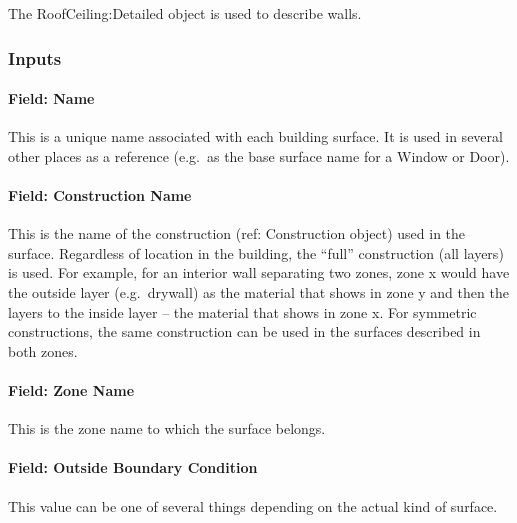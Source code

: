 The RoofCeiling:Detailed object is used to describe walls.

\subsubsection{Inputs}\label{inputs-21-007}

\paragraph{Field: Name}\label{field-name-17-008}

This is a unique name associated with each building surface. It is used in several other places as a reference (e.g.~as the base surface name for a Window or Door).

\paragraph{Field: Construction Name}\label{field-construction-name-17}

This is the name of the construction (ref: Construction object) used in the surface. Regardless of location in the building, the ``full'' construction (all layers) is used. For example, for an interior wall separating two zones, zone x would have the outside layer (e.g.~drywall) as the material that shows in zone y and then the layers to the inside layer -- the material that shows in zone x. For symmetric constructions, the same construction can be used in the surfaces described in both zones.

\paragraph{Field: Zone Name}\label{field-zone-name-11-000}

This is the zone name to which the surface belongs.

\paragraph{Field: Outside Boundary Condition}\label{field-outside-boundary-condition-1}

This value can be one of several things depending on the actual kind of surface.

